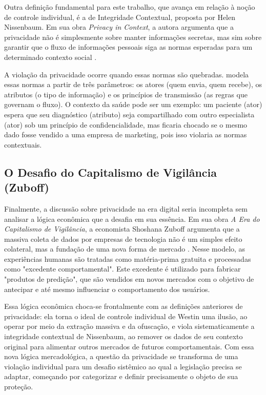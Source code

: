 Outra definição fundamental para este trabalho, que avança em relação à noção de controle individual, é a de Integridade Contextual, proposta por Helen Nissenbaum. Em sua obra \textit{Privacy in Context}, a autora argumenta que a privacidade não é simplesmente sobre manter informações secretas, mas sim sobre garantir que o fluxo de informações pessoais siga as normas esperadas para um determinado contexto social \cite{Nissenbaum2009}. 

A violação da privacidade ocorre quando essas normas são quebradas.  modela essas normas a partir de três parâmetros: os atores (quem envia, quem recebe), os atributos (o tipo de informação) e os princípios de transmissão (as regras que governam o fluxo). O contexto da saúde pode ser um exemplo: um paciente (ator) espera que seu diagnóstico (atributo) seja compartilhado com outro especialista (ator) sob um princípio de confidencialidade, mas ficaria chocado se o mesmo dado fosse vendido a uma empresa de marketing, pois isso violaria as normas contextuais.

\subsection{O Desafio do Capitalismo de Vigilância (Zuboff)}
\label{subsec:fund-zuboff}

Finalmente, a discussão sobre privacidade na era digital seria incompleta sem analisar a lógica econômica que a desafia em sua essência. Em sua obra \textit{A Era do Capitalismo de Vigilância}, a economista Shoshana Zuboff argumenta que a massiva coleta de dados por empresas de tecnologia não é um simples efeito colateral, mas a fundação de uma nova forma de mercado \cite{Zuboff2019}. Nesse modelo, as experiências humanas são tratadas como matéria-prima gratuita e processadas como "excedente comportamental". Este excedente é utilizado para fabricar "produtos de predição", que são vendidos em novos mercados com o objetivo de antecipar e até mesmo influenciar o comportamento dos usuários.

Essa lógica econômica choca-se frontalmente com as definições anteriores de privacidade: ela torna o ideal de controle individual de Westin uma ilusão, ao operar por meio da extração massiva e da ofuscação, e viola sistematicamente a integridade contextual de Nissenbaum, ao remover os dados de seu contexto original para alimentar outros mercados de futuros comportamentais. Com essa nova lógica mercadológica, a questão da privacidade se transforma de uma violação individual para um desafio sistêmico ao qual a legislação precisa se adaptar, começando por categorizar e definir precisamente o objeto de sua proteção.


